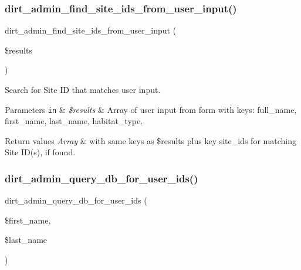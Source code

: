 \subsubsection{\texorpdfstring{dirt\+\_\+admin\+\_\+find\+\_\+site\+\_\+ids\+\_\+from\+\_\+user\+\_\+input()}{dirt\_admin\_find\_site\_ids\_from\_user\_input()}}
{\footnotesize\ttfamily dirt\+\_\+admin\+\_\+find\+\_\+site\+\_\+ids\+\_\+from\+\_\+user\+\_\+input (\begin{DoxyParamCaption}\item[{}]{\$results }\end{DoxyParamCaption})}

Search for Site ID that matches user input.


\begin{DoxyParams}[1]{Parameters}
\mbox{\tt in}  & {\em \$results} & Array of user input from form with keys\+: \textquotesingle{}full\+\_\+name\textquotesingle{}, \textquotesingle{}first\+\_\+name\textquotesingle{}, \textquotesingle{}last\+\_\+name\textquotesingle{}, \textquotesingle{}habitat\+\_\+type\textquotesingle{}.\\
\hline
\end{DoxyParams}

\begin{DoxyRetVals}{Return values}
{\em Array} & with same keys as \$results plus key \textquotesingle{}site\+\_\+ids\textquotesingle{} for matching Site I\+D(s), if found. \\
\hline
\end{DoxyRetVals}
\mbox{\label{dirt_8admin_8inc_a4414114d7df39a6daaea00db09b6c0ca}} 
\subsubsection{\texorpdfstring{dirt\+\_\+admin\+\_\+query\+\_\+db\+\_\+for\+\_\+user\+\_\+ids()}{dirt\_admin\_query\_db\_for\_user\_ids()}}
{\footnotesize\ttfamily dirt\+\_\+admin\+\_\+query\+\_\+db\+\_\+for\+\_\+user\+\_\+ids (\begin{DoxyParamCaption}\item[{}]{\$first\+\_\+name,  }\item[{}]{\$last\+\_\+name }\end{DoxyParamCaption})}

